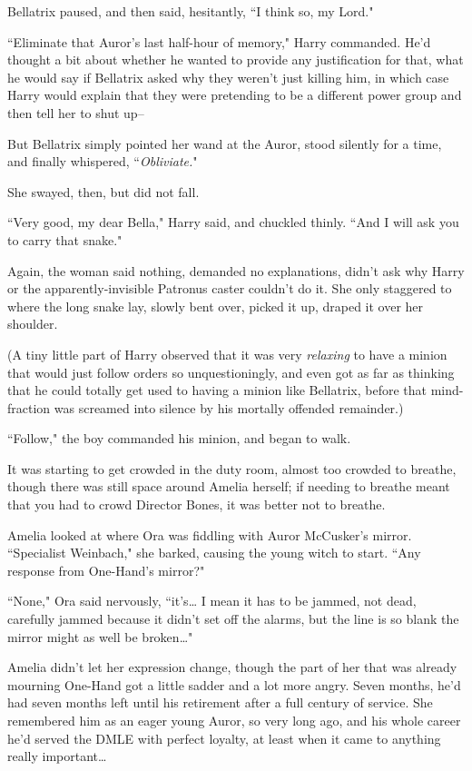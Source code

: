Bellatrix paused, and then said, hesitantly, ``I think so, my Lord."

``Eliminate that Auror's last half-hour of memory," Harry commanded. He'd thought a bit about whether he wanted to provide any justification for that, what he would say if Bellatrix asked why they weren't just killing him, in which case Harry would explain that they were pretending to be a different power group and then tell her to shut up\---

But Bellatrix simply pointed her wand at the Auror, stood silently for a time, and finally whispered, ``\emph{Obliviate.}"

She swayed, then, but did not fall.

``Very good, my dear Bella," Harry said, and chuckled thinly. ``And I will ask you to carry that snake."

Again, the woman said nothing, demanded no explanations, didn't ask why Harry or the apparently-invisible Patronus caster couldn't do it. She only staggered to where the long snake lay, slowly bent over, picked it up, draped it over her shoulder.

(A tiny little part of Harry observed that it was very \emph{relaxing} to have a minion that would just follow orders so unquestioningly, and even got as far as thinking that he could totally get used to having a minion like Bellatrix, before that mind-fraction was screamed into silence by his mortally offended remainder.)

``Follow," the boy commanded his minion, and began to walk.

\later

It was starting to get crowded in the duty room, almost too crowded to breathe, though there was still space around Amelia herself; if needing to breathe meant that you had to crowd Director Bones, it was better not to breathe.

Amelia looked at where Ora was fiddling with Auror McCusker's mirror. ``Specialist Weinbach," she barked, causing the young witch to start. ``Any response from One-Hand's mirror?"

``None," Ora said nervously, ``it's{\ldots} I mean it has to be jammed, not dead, carefully jammed because it didn't set off the alarms, but the line is so blank the mirror might as well be broken{\ldots}"

Amelia didn't let her expression change, though the part of her that was already mourning One-Hand got a little sadder and a lot more angry. Seven months, he'd had seven months left until his retirement after a full century of service. She remembered him as an eager young Auror, so very long ago, and his whole career he'd served the DMLE with perfect loyalty, at least when it came to anything really important{\ldots}

